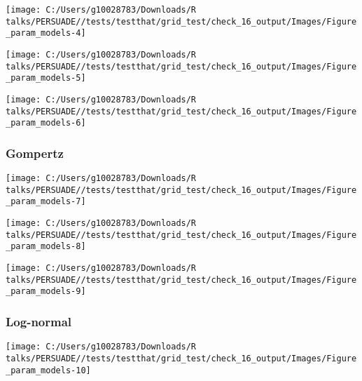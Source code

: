 \documentclass[
]{article}
\begin{document}
\begin{flushleft}\texttt{[image: C:/Users/g10028783/Downloads/R talks/PERSUADE//tests/testthat/grid\_test/check\_16\_output/Images/Figure\_param\_models-4]} \end{flushleft}

\begin{flushleft}\texttt{[image: C:/Users/g10028783/Downloads/R talks/PERSUADE//tests/testthat/grid\_test/check\_16\_output/Images/Figure\_param\_models-5]} \end{flushleft}

\begin{flushleft}\texttt{[image: C:/Users/g10028783/Downloads/R talks/PERSUADE//tests/testthat/grid\_test/check\_16\_output/Images/Figure\_param\_models-6]} \end{flushleft}

\clearpage

\subsubsection{Gompertz}\label{gompertz}

\begin{flushleft}\texttt{[image: C:/Users/g10028783/Downloads/R talks/PERSUADE//tests/testthat/grid\_test/check\_16\_output/Images/Figure\_param\_models-7]} \end{flushleft}

\begin{flushleft}\texttt{[image: C:/Users/g10028783/Downloads/R talks/PERSUADE//tests/testthat/grid\_test/check\_16\_output/Images/Figure\_param\_models-8]} \end{flushleft}

\begin{flushleft}\texttt{[image: C:/Users/g10028783/Downloads/R talks/PERSUADE//tests/testthat/grid\_test/check\_16\_output/Images/Figure\_param\_models-9]} \end{flushleft}

\clearpage

\subsubsection{Log-normal}\label{log-normal}

\begin{flushleft}\texttt{[image: C:/Users/g10028783/Downloads/R talks/PERSUADE//tests/testthat/grid\_test/check\_16\_output/Images/Figure\_param\_models-10]} \end{flushleft}
\end{document}

